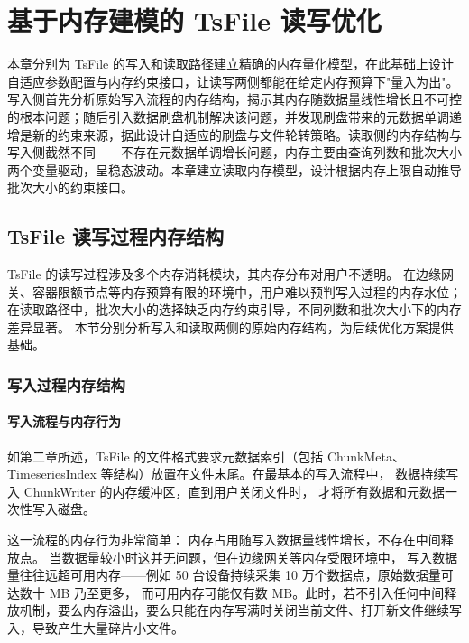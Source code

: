 
\chapter{基于内存建模的 TsFile 读写优化}

本章分别为 TsFile 的写入和读取路径建立精确的内存量化模型，在此基础上设计自适应参数配置与内存约束接口，让读写两侧都能在给定内存预算下"量入为出"。写入侧首先分析原始写入流程的内存结构，揭示其内存随数据量线性增长且不可控的根本问题；随后引入数据刷盘机制解决该问题，并发现刷盘带来的元数据单调递增是新的约束来源，据此设计自适应的刷盘与文件轮转策略。读取侧的内存结构与写入侧截然不同——不存在元数据单调增长问题，内存主要由查询列数和批次大小两个变量驱动，呈稳态波动。本章建立读取内存模型，设计根据内存上限自动推导批次大小的约束接口。


\section{TsFile 读写过程内存结构}

TsFile 的读写过程涉及多个内存消耗模块，其内存分布对用户不透明。
在边缘网关、容器限额节点等内存预算有限的环境中，用户难以预判写入过程的内存水位；
在读取路径中，批次大小的选择缺乏内存约束引导，不同列数和批次大小下的内存差异显著。
本节分别分析写入和读取两侧的原始内存结构，为后续优化方案提供基础。

\subsection{写入过程内存结构}

\subsubsection{写入流程与内存行为}

如第二章所述，TsFile 的文件格式要求元数据索引（包括 ChunkMeta、
TimeseriesIndex 等结构）放置在文件末尾。在最基本的写入流程中，
数据持续写入 ChunkWriter 的内存缓冲区，直到用户关闭文件时，
才将所有数据和元数据一次性写入磁盘。

这一流程的内存行为非常简单：
内存占用随写入数据量线性增长，不存在中间释放点。
当数据量较小时这并无问题，但在边缘网关等内存受限环境中，
写入数据量往往远超可用内存——例如 50 台设备持续采集
10 万个数据点，原始数据量可达数十 MB 乃至更多，
而可用内存可能仅有数 MB。此时，若不引入任何中间释放机制，要么内存溢出，要么只能在内存写满时关闭当前文件、打开新文件继续写入，导致产生大量碎片小文件。

